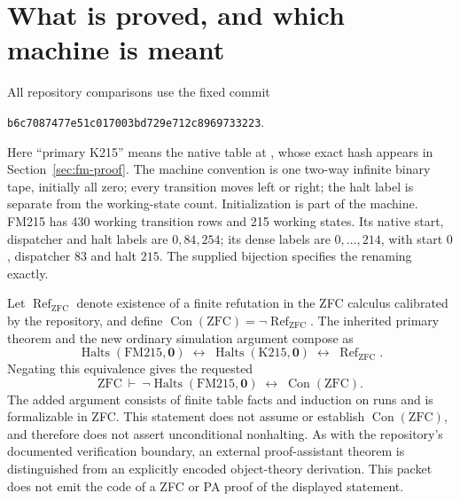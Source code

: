 \documentclass[11pt,a4paper]{article}
\newcommand{\Con}{\operatorname{Con}}
\newcommand{\Halts}{\operatorname{Halts}}
\begin{document}
\clearpage
\tableofcontents
\clearpage

\section{What is proved, and which machine is meant}
\label{sec:status}

All repository comparisons use the fixed commit
\begin{center}\texttt{b6c7087477e51c017003bd729e712c8969733223}.\end{center}
Here ``primary K215'' means the native table at
, whose exact hash appears in
Section~\ref{sec:fm-proof}. The machine convention is one two-way infinite
binary tape, initially all zero; every transition moves left or right;
the halt label is separate from the working-state count. Initialization
is part of the machine. FM215 has 430 working transition rows and 215
working states. Its native start, dispatcher and halt labels are
$0,84,254$; its dense labels are $0,\ldots,214$, with start $0$,
dispatcher $83$ and halt $215$. The supplied bijection specifies the
renaming exactly.

Let $\operatorname{Ref}_{\mathrm{ZFC}}$ denote existence of a finite
refutation in the ZFC calculus calibrated by the repository, and define
$\Con(\mathrm{ZFC})=\neg\operatorname{Ref}_{\mathrm{ZFC}}$. The inherited
primary theorem and the new ordinary simulation argument compose as
\[
 \Halts(\mathrm{FM215},\mathbf 0)
 \;\longleftrightarrow\;
 \Halts(\mathrm{K215},\mathbf 0)
 \;\longleftrightarrow\;
 \operatorname{Ref}_{\mathrm{ZFC}}.
\]
Negating this equivalence gives the requested
\[
 \mathrm{ZFC}\ \vdash\
 \neg\Halts(\mathrm{FM215},\mathbf 0)
 \;\longleftrightarrow\;\Con(\mathrm{ZFC}).
\]
The added argument consists of finite table facts and induction on runs
and is formalizable in ZFC. This statement does not assume or establish
$\Con(\mathrm{ZFC})$, and therefore does not assert unconditional
nonhalting. As with the repository's documented verification boundary,
an external proof-assistant theorem is distinguished from an explicitly
encoded object-theory derivation. This packet does not emit the code of a
ZFC or PA proof of the displayed statement.\cite{verification}
\end{document}
